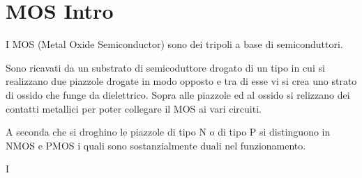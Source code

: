 \documentclass[\main/main.tex]{subfiles}
\begin{document}
\section{MOS Intro}

I MOS (Metal Oxide Semiconductor) sono dei tripoli a base di semiconduttori.

Sono ricavati da un substrato di semicoduttore drogato di un tipo in cui si realizzano due piazzole drogate in modo opposto e tra di esse vi si crea uno strato di ossido che funge da dielettrico.
Sopra alle piazzole ed al ossido si relizzano dei contatti metallici per poter collegare il MOS ai vari circuiti.

A seconda che si droghino le piazzole di tipo N o di tipo P si distinguono in NMOS e PMOS i quali sono sostanzialmente duali nel funzionamento.

I
\end{document}
